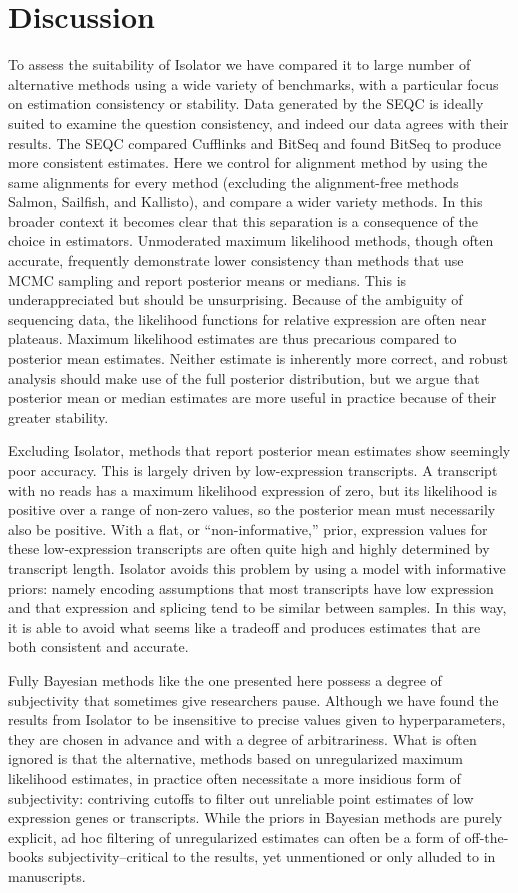 \documentclass[twocolumn]{article}
\begin{document}
\section{Discussion}\label{discussion}

To assess the suitability of Isolator we have compared it to large number of
alternative methods using a wide variety of benchmarks, with a particular focus
on estimation consistency or stability. Data generated by the SEQC is ideally
suited to examine the question consistency, and indeed our data agrees with
their results. The SEQC compared Cufflinks and BitSeq and found BitSeq to
produce more consistent estimates. Here we control for alignment method by using
the same alignments for every method (excluding the alignment-free methods
Salmon, Sailfish, and Kallisto), and compare a wider variety methods. In this
broader context it becomes clear that this separation is a consequence of the
choice in estimators. Unmoderated maximum likelihood methods, though often
accurate, frequently demonstrate lower consistency than methods that use MCMC
sampling and report posterior means or medians. This is underappreciated but
should be unsurprising.  Because of the ambiguity of sequencing data, the
likelihood functions for relative expression are often near plateaus. Maximum
likelihood estimates are thus precarious compared to posterior mean
estimates. Neither estimate is inherently more correct, and robust analysis
should make use of the full posterior distribution, but we argue that posterior
mean or median estimates are more useful in practice because of their greater
stability.

Excluding Isolator, methods that report posterior mean estimates show seemingly
poor accuracy. This is largely driven by low-expression transcripts. A
transcript with no reads has a maximum likelihood expression of zero, but its
likelihood is positive over a range of non-zero values, so the posterior mean
must necessarily also be positive. With a flat, or ``non-informative,'' prior,
expression values for these low-expression transcripts are often quite high and
highly determined by transcript length.  Isolator avoids this problem by using a
model with informative priors: namely encoding assumptions that most transcripts
have low expression and that expression and splicing tend to be similar between
samples. In this way, it is able to avoid what seems like a tradeoff and
produces estimates that are both consistent and accurate.

Fully Bayesian methods like the one presented here possess a degree of
subjectivity that sometimes give researchers pause. Although we have found the
results from Isolator to be insensitive to precise values given to
hyperparameters, they are chosen in advance and with a degree of arbitrariness.
What is often ignored is that the alternative, methods based on unregularized
maximum likelihood estimates, in practice often necessitate a more insidious
form of subjectivity: contriving cutoffs to filter out unreliable point
estimates of low expression genes or transcripts. While the priors in Bayesian
methods are purely explicit, ad hoc filtering of unregularized estimates can
often be a form of off-the-books subjectivity--critical to the results, yet
unmentioned or only alluded to in manuscripts.
\end{document}
